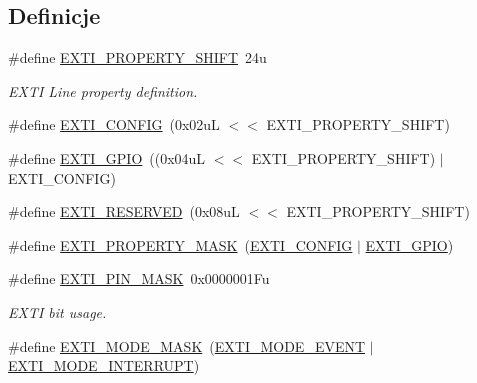 \subsection*{Definicje}
\begin{DoxyCompactItemize}
\item 
\#define \hyperlink{group___e_x_t_i___private___constants_ga508bbe670f4f32775988b55e6914b6ec}{E\+X\+T\+I\+\_\+\+P\+R\+O\+P\+E\+R\+T\+Y\+\_\+\+S\+H\+I\+FT}~24u
\begin{DoxyCompactList}\small\item\em E\+X\+TI Line property definition. \end{DoxyCompactList}\item 
\#define \hyperlink{group___e_x_t_i___private___constants_ga6f245ca02e17c1798fe43a66ea5b7fa4}{E\+X\+T\+I\+\_\+\+C\+O\+N\+F\+IG}~(0x02u\+L $<$$<$ E\+X\+T\+I\+\_\+\+P\+R\+O\+P\+E\+R\+T\+Y\+\_\+\+S\+H\+I\+F\+T)
\item 
\#define \hyperlink{group___e_x_t_i___private___constants_gacfa322960fc87db022536119cabb4d2a}{E\+X\+T\+I\+\_\+\+G\+P\+IO}~((0x04u\+L $<$$<$ E\+X\+T\+I\+\_\+\+P\+R\+O\+P\+E\+R\+T\+Y\+\_\+\+S\+H\+I\+F\+T) $\vert$ E\+X\+T\+I\+\_\+\+C\+O\+N\+F\+I\+G)
\item 
\#define \hyperlink{group___e_x_t_i___private___constants_gac15c8e004a79171f659e6cba49e8a57a}{E\+X\+T\+I\+\_\+\+R\+E\+S\+E\+R\+V\+ED}~(0x08u\+L $<$$<$ E\+X\+T\+I\+\_\+\+P\+R\+O\+P\+E\+R\+T\+Y\+\_\+\+S\+H\+I\+F\+T)
\item 
\#define \hyperlink{group___e_x_t_i___private___constants_ga6aa8e044ea8987b6839f419123734e4b}{E\+X\+T\+I\+\_\+\+P\+R\+O\+P\+E\+R\+T\+Y\+\_\+\+M\+A\+SK}~(\hyperlink{group___e_x_t_i___private___constants_ga6f245ca02e17c1798fe43a66ea5b7fa4}{E\+X\+T\+I\+\_\+\+C\+O\+N\+F\+IG} $\vert$ \hyperlink{group___e_x_t_i___private___constants_gacfa322960fc87db022536119cabb4d2a}{E\+X\+T\+I\+\_\+\+G\+P\+IO})
\item 
\#define \hyperlink{group___e_x_t_i___private___constants_ga755405defae45017e19a17fd0279869c}{E\+X\+T\+I\+\_\+\+P\+I\+N\+\_\+\+M\+A\+SK}~0x0000001\+Fu
\begin{DoxyCompactList}\small\item\em E\+X\+TI bit usage. \end{DoxyCompactList}\item 
\#define \hyperlink{group___e_x_t_i___private___constants_ga657f081646b552ee10bdfc7af94b5cdf}{E\+X\+T\+I\+\_\+\+M\+O\+D\+E\+\_\+\+M\+A\+SK}~(\hyperlink{group___e_x_t_i___mode_ga672fef88f86b5d8a421194e3dac0f2e1}{E\+X\+T\+I\+\_\+\+M\+O\+D\+E\+\_\+\+E\+V\+E\+NT} $\vert$ \hyperlink{group___e_x_t_i___mode_gae1e032ec592296be21f416a79a44f4f5}{E\+X\+T\+I\+\_\+\+M\+O\+D\+E\+\_\+\+I\+N\+T\+E\+R\+R\+U\+PT})
$$
\end{DoxyCompactItemize}
